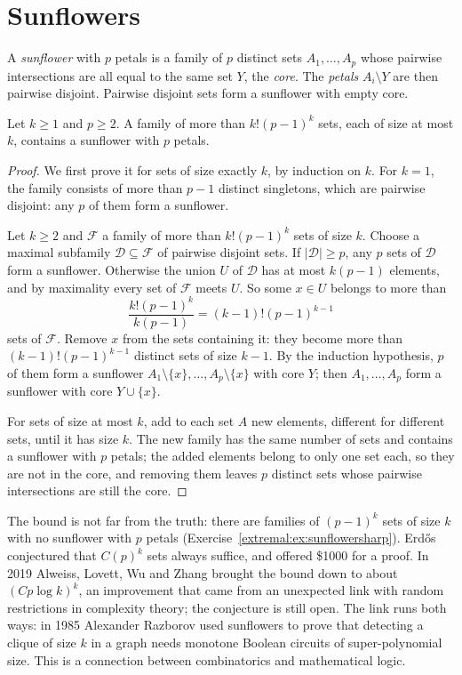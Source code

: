\section{Sunflowers}

A \emph{sunflower} with $p$ petals is a family of $p$ distinct sets $A_1,\dots,A_p$ whose pairwise intersections are all equal to the same set $Y$, the \emph{core}. The
\emph{petals} $A_i\setminus Y$ are then pairwise disjoint. Pairwise disjoint sets form a sunflower with empty core.

\begin{theorem}\label{extremal:thm:sunflower}
Let $k\ge1$ and $p\ge2$. A family of more than $k!(p-1)^k$ sets, each of size at most $k$, contains a sunflower with $p$ petals.
\end{theorem}
\begin{proof}
We first prove it for sets of size exactly $k$, by induction on $k$. For $k=1$, the family consists of more than $p-1$ distinct singletons, which are pairwise disjoint: any $p$ of them form a sunflower.

Let $k\ge2$ and $\mathcal F$ a family of more than $k!(p-1)^k$ sets of size $k$. Choose a maximal subfamily $\mathcal D\subseteq\mathcal F$ of pairwise disjoint sets. If $|\mathcal D|\ge p$,
any $p$ sets of $\mathcal D$ form a sunflower. Otherwise the union $U$ of $\mathcal D$ has at most $k(p-1)$ elements, and by maximality every set of $\mathcal F$ meets $U$. So some $x\in U$ belongs to
more than
\[
\frac{k!(p-1)^k}{k(p-1)}=(k-1)!(p-1)^{k-1}
\]
sets of $\mathcal F$. Remove $x$ from the sets containing it: they become more than $(k-1)!(p-1)^{k-1}$ distinct sets of size $k-1$. By the induction hypothesis, $p$ of them form a sunflower
$A_1\setminus\{x\},\dots,A_p\setminus\{x\}$ with core $Y$; then $A_1,\dots,A_p$ form a sunflower with core $Y\cup\{x\}$.

For sets of size at most $k$, add to each set $A$ new elements, different for different sets, until it has size $k$. The new family has the same number of sets and
contains a sunflower with $p$ petals; the added elements belong to only one set each, so they are not in the core, and removing them leaves $p$ distinct sets whose pairwise
intersections are still the core.
\end{proof}

The bound is not far from the truth: there are families of $(p-1)^k$ sets of size $k$ with no sunflower with $p$ petals (Exercise~\ref{extremal:ex:sunflowersharp}). Erd\H os
conjectured that $C(p)^k$ sets always suffice, and offered \$1000 for a proof. In 2019 Alweiss, Lovett, Wu and Zhang brought the bound down to about $(Cp\log k)^k$, an
improvement that came from an unexpected link with random restrictions in complexity theory; the conjecture is still open. The link runs both ways: in 1985 Alexander
Razborov used sunflowers to prove that detecting a clique of size $k$ in a graph needs monotone Boolean circuits of super-polynomial size. This is a connection between combinatorics and mathematical logic.

